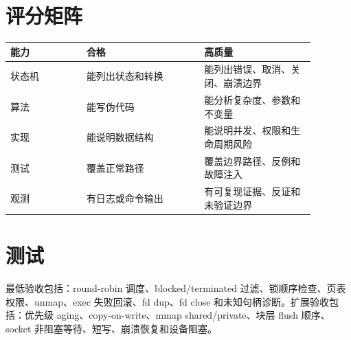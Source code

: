 \section{评分矩阵}

\begin{longtable}{p{0.22\linewidth}p{0.34\linewidth}p{0.32\linewidth}}
\toprule
能力 & 合格 & 高质量 \\
\midrule
状态机 & 能列出状态和转换 & 能列出错误、取消、关闭、崩溃边界 \\
算法 & 能写伪代码 & 能分析复杂度、参数和不变量 \\
实现 & 能说明数据结构 & 能说明并发、权限和生命周期风险 \\
测试 & 覆盖正常路径 & 覆盖边界路径、反例和故障注入 \\
观测 & 有日志或命令输出 & 有可复现证据、反证和未验证边界 \\
\bottomrule
\end{longtable}

\section{测试}

最低验收包括：round-robin 调度、blocked/terminated 过滤、锁顺序检查、页表权限、unmap、exec 失败回滚、fd dup、fd close 和未知句柄诊断。扩展验收包括：优先级 aging、copy-on-write、mmap shared/private、块层 flush 顺序、socket 非阻塞等待、短写、崩溃恢复和设备阻塞。

